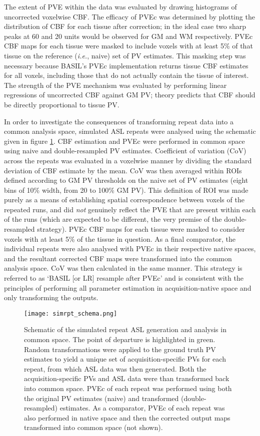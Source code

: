 The extent of PVE within the data was evaluated by drawing histograms of uncorrected voxelwise CBF. The efficacy of PVEc was determined by plotting the distribution of CBF for each tissue after correction; in the ideal case two sharp peaks at 60 and 20 units would be observed for GM and WM respectively. PVEc CBF maps for each tissue were masked to include voxels with at least 5\% of that tissue on the reference (\textit{i.e.}, naive) set of PV estimates. This masking step was necessary because BASIL's PVEc implementation returns tissue CBF estimates for all voxels, including those that do not actually contain the tissue of interest. The strength of the PVE mechanism was evaluated by performing linear regressions of uncorrected CBF against GM PV; theory predicts that CBF should be directly proportional to tissue PV. 

In order to investigate the consequences of transforming repeat data into a common analysis space, simulated ASL repeats were analysed using the schematic given in figure \ref{simrpt_schema}. CBF estimation and PVEc were performed in common space using naive and double-resampled PV estimates. Coefficient of variation (CoV) across the repeats was evaluated in a voxelwise manner by dividing the standard deviation of CBF estimate by the mean. CoV was then averaged within ROIs defined according to GM PV thresholds on the naive set of PV estimates (eight bins of 10\% width, from 20 to 100\% GM PV). This definition of ROI was made purely as a means of establishing spatial correspondence between voxels of the repeated runs, and did \textit{not} genuinely reflect the PVE that are present within each of the runs (which are expected to be different, the very premise of the double-resampled strategy). PVEc CBF maps for each tissue were masked to consider voxels with at least 5\% of the tissue in question. As a final comparator, the individual repeats were also analysed with PVEc in their respective native spaces, and the resultant corrected CBF maps were transformed into the common analysis space. CoV was then calculated in the same manner. This strategy is referred to as `BASIL [or LR] resample after PVEc' and is consistent with the principles of performing all parameter estimation in acquisition-native space and only transforming the outputs.

\begin{figure}[h]
\centering
\texttt{[image: simrpt\_schema.png]}
\caption{Schematic of the simulated repeat ASL generation and analysis in common space. The point of departure is highlighted in green. Random transformations were applied to the ground truth PV estimates to yield a unique set of acquisition-specific PVs for each repeat, from which ASL data was then generated. Both the acquisition-specific PVs and ASL data were than transformed back into common space. PVEc of each repeat was performed using both the original PV estimates (naive) and transformed (double-resampled) estimates. As a comparator, PVEc of each repeat was also performed in native space and then the corrected output maps transformed into common space (not shown).}
\label{simrpt_schema}
\end{figure}

